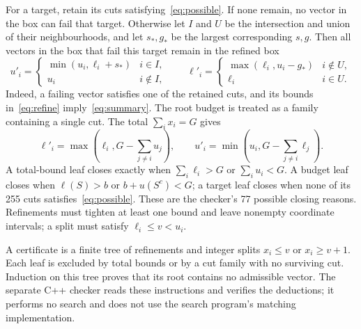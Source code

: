 \documentclass[11pt]{article}
\theoremstyle{remark}
\begin{document}
For a target, retain its cuts satisfying~\eqref{eq:possible}. If none remain,
no vector in the box can fail that target. Otherwise let $I$ and $U$ be the
intersection and union of their neighbourhoods, and let $s_*,g_*$ be the
largest corresponding $s,g$. Then all vectors in the box that fail this
target remain in the refined box
\begin{equation}\label{eq:summary}
 u'_i=\begin{cases}\min(u_i,\ell_i+s_*)&i\in I,\\u_i&i\notin I,\end{cases}
 \qquad
 \ell'_i=\begin{cases}\max(\ell_i,u_i-g_*)&i\notin U,\\\ell_i&i\in U.\end{cases}
\end{equation}
Indeed, a failing vector satisfies one of the retained cuts, and its bounds
in~\eqref{eq:refine} imply~\eqref{eq:summary}. The root budget is treated as
a family containing a single cut. The total $\sum_i x_i=G$ gives
\[
 \ell'_i=\max\!\left(\ell_i,G-\sum_{j\ne i}u_j\right),\qquad
 u'_i=\min\!\left(u_i,G-\sum_{j\ne i}\ell_j\right).
\]
A total-bound leaf closes exactly when $\sum_i\ell_i>G$ or
$\sum_i u_i<G$. A budget leaf closes when
$\ell(S)>b$ or $b+u(S^c)<G$; a target leaf closes when none of its
255 cuts satisfies~\eqref{eq:possible}. These are the checker's 77 possible
closing reasons. Refinements must tighten at least one bound and leave
nonempty coordinate intervals; a split must satisfy $\ell_i\le v<u_i$.

A certificate is a finite tree of refinements and integer splits
$x_i\le v$ or $x_i\ge v+1$. Each leaf is excluded by total bounds or by a
cut family with no surviving cut. Induction on this tree proves that its
root contains no admissible vector. The separate C++ checker reads these
instructions and verifies the deductions; it performs no search and does
not use the search program's matching implementation.
\end{document}

